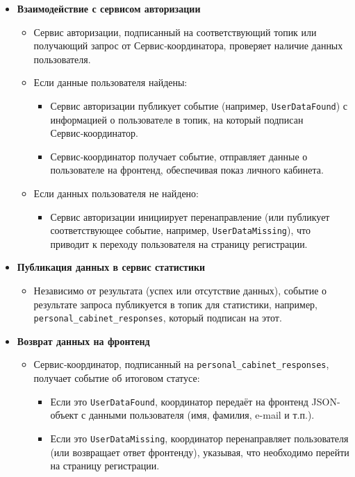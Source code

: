 \begin{enumerate}
\begin{itemize}
        \item \textbf{Взаимодействие с сервисом авторизации}
        \begin{itemize}
            \item Сервис авторизации, подписанный на соответствующий топик или получающий запрос от Сервис‑координатора, проверяет наличие данных пользователя.
            \item Если данные пользователя найдены:
            \begin{itemize}
                \item Сервис авторизации публикует событие (например, \texttt{UserDataFound}) с информацией о пользователе в топик, на который подписан Сервис‑координатор.
                \item Сервис‑координатор получает событие, отправляет данные о пользователе на фронтенд, обеспечивая показ личного кабинета.
            \end{itemize}
            \item Если данных пользователя не найдено:
            \begin{itemize}
                \item Сервис авторизации инициирует перенаправление (или публикует соответствующее событие, например, \texttt{UserDataMissing}), что приводит к переходу пользователя на страницу регистрации.
            \end{itemize}
        \end{itemize}

        \item \textbf{Публикация данных в сервис статистики}
        \begin{itemize}
            \item Независимо от результата (успех или отсутствие данных), событие о результате запроса публикуется в топик для статистики, например, \texttt{personal\_cabinet\_responses}, который подписан на этот.
        \end{itemize}

        \item \textbf{Возврат данных на фронтенд}
        \begin{itemize}
            \item Сервис‑координатор, подписанный на \texttt{personal\_cabinet\_responses}, получает событие об итоговом статусе:
                \begin{itemize}
                    \item Если это \texttt{UserDataFound}, координатор передаёт на фронтенд JSON-объект с данными пользователя (имя, фамилия, e-mail и т.п.).
                    \item Если это \texttt{UserDataMissing}, координатор перенаправляет пользователя (или возвращает ответ фронтенду), указывая, что необходимо перейти на страницу регистрации.
                \end{itemize}
        \end{itemize}


\end{itemize}
\end{enumerate}

